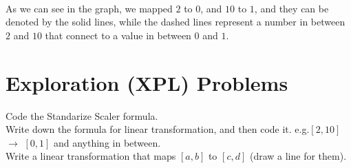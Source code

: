 \begin{outline}[enumerate]
\begin{center}
 \\
\end{center}

As we can see in the graph, we mapped $2$ to $0$, and $10$ to $1$, and they can be denoted by the solid lines,
while the dashed lines represent a number in between $2$ and $10$ that connect to a value in between $0$ and $1$.

\end{outline}

\section{Exploration (XPL) Problems}
\begin{outline}[enumerate]

    \1  Code the Standarize Scaler formula. \\

    \1  Write down the formula for linear transformation, and then code it. e.g.$[2,10]$ $\rightarrow$ $[0,1]$ and anything in between.\\

    \1 Write a linear transformation that maps $[a,b]$ to $[c,d]$ (draw a line for them). \\

\end{outline}


